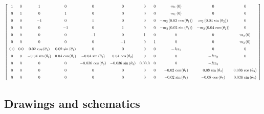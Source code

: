 \begin{equation}\label{MatA}\scalemath{0.6}{
 \left[ \begin {array}{ccccccccccc} 1&0&1&0&0&0&0&0&m_{1} \left( 0
 \right) &0&0\\ \noalign{\medskip}0&1&0&1&0&0&0&0&m_{1} \left( 0
 \right) &0&0\\ \noalign{\medskip}0&0&-1&0&1&0&0&0&-m_{2} \left(  0.02
\,\cos \left( \theta_{{1}} \right)  \right) &m_{2} \left(  0.04\,\sin
 \left( \theta_{{2}} \right)  \right) &0\\ \noalign{\medskip}0&0&0&-1&0
&1&0&0&-m_{2} \left(  0.02\,\sin \left( \theta_{{1}} \right)  \right) 
&-m_{2} \left(  0.04\,\cos \left( \theta_{{2}} \right)  \right) &0
\\ \noalign{\medskip}0&0&0&0&-1&0&1&0&0&0&m_{3} \left( 0 \right) 
\\ \noalign{\medskip}0&0&0&0&0&-1&0&1&0&0&m_{3} \left( 0 \right) 
\\ \noalign{\medskip} 0.0& 0.0& 0.02\,\cos \left( \theta_{{1}}
 \right) & 0.02\,\sin \left( \theta_{{1}} \right) &0&0&0&0&-{\it Izz}_
{{1}}&0&0\\ \noalign{\medskip}0&0&- 0.04\,\sin \left( \theta_{{2}}
 \right) & 0.04\,\cos \left( \theta_{{2}} \right) &- 0.04\,\sin
 \left( \theta_{{2}} \right) & 0.04\,\cos \left( \theta_{{2}} \right) 
&0&0&0&-{\it Izz}_{{2}}&0\\ \noalign{\medskip}0&0&0&0&- 0.036\,\cos
 \left( \theta_{{3}} \right) &- 0.036\,\sin \left( \theta_{{3}}
 \right) & 0.0 0.0&0&0&-{\it Izz}_{{3}}\\ \noalign{\medskip}0&0&0&0
&0&0&0&0&- 0.02\,\cos \left( \theta_{{1}} \right) & 0.08\,\sin \left( 
\theta_{{2}} \right) & 0.036\,\cos \left( \theta_{{3}} \right) 
\\ \noalign{\medskip}0&0&0&0&0&0&0&0&- 0.02\,\sin \left( \theta_{{1}}
 \right) &- 0.08\,\cos \left( \theta_{{2}} \right) & 0.036\,\sin
 \left( \theta_{{3}} \right) \end {array} \right]
 }
\end{equation}

\subsection{Drawings and schematics}

